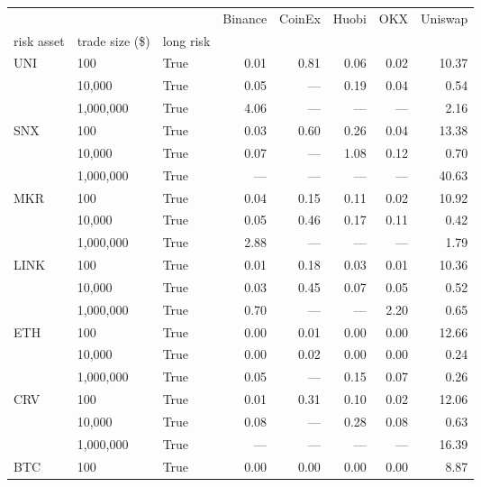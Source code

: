 \begin{tabular}{lllrrrrr}
\toprule
     &        &       &  Binance &  CoinEx &  Huobi &  OKX &  Uniswap \\
risk asset & trade size (\$) & long risk &          &         &        &      &          \\
\midrule
\multirow{3}{*}{UNI} & 100 & True  &     0.01 &    0.81 &   0.06 & 0.02 &    10.37 \\
     & 10,000 & True  &     0.05 &     --- &   0.19 & 0.04 &     0.54 \\
     & 1,000,000 & True  &     4.06 &     --- &    --- &  --- &     2.16 \\
\cline{1-8}
\multirow{3}{*}{SNX} & 100 & True  &     0.03 &    0.60 &   0.26 & 0.04 &    13.38 \\
     & 10,000 & True  &     0.07 &     --- &   1.08 & 0.12 &     0.70 \\
     & 1,000,000 & True  &      --- &     --- &    --- &  --- &    40.63 \\
\cline{1-8}
\multirow{3}{*}{MKR} & 100 & True  &     0.04 &    0.15 &   0.11 & 0.02 &    10.92 \\
     & 10,000 & True  &     0.05 &    0.46 &   0.17 & 0.11 &     0.42 \\
     & 1,000,000 & True  &     2.88 &     --- &    --- &  --- &     1.79 \\
\cline{1-8}
\multirow{3}{*}{LINK} & 100 & True  &     0.01 &    0.18 &   0.03 & 0.01 &    10.36 \\
     & 10,000 & True  &     0.03 &    0.45 &   0.07 & 0.05 &     0.52 \\
     & 1,000,000 & True  &     0.70 &     --- &    --- & 2.20 &     0.65 \\
\cline{1-8}
\multirow{3}{*}{ETH} & 100 & True  &     0.00 &    0.01 &   0.00 & 0.00 &    12.66 \\
     & 10,000 & True  &     0.00 &    0.02 &   0.00 & 0.00 &     0.24 \\
     & 1,000,000 & True  &     0.05 &     --- &   0.15 & 0.07 &     0.26 \\
\cline{1-8}
\multirow{3}{*}{CRV} & 100 & True  &     0.01 &    0.31 &   0.10 & 0.02 &    12.06 \\
     & 10,000 & True  &     0.08 &     --- &   0.28 & 0.08 &     0.63 \\
     & 1,000,000 & True  &      --- &     --- &    --- &  --- &    16.39 \\
\cline{1-8}
\multirow{3}{*}{BTC} & 100 & True  &     0.00 &    0.00 &   0.00 & 0.00 &     8.87 \\

\end{tabular}
